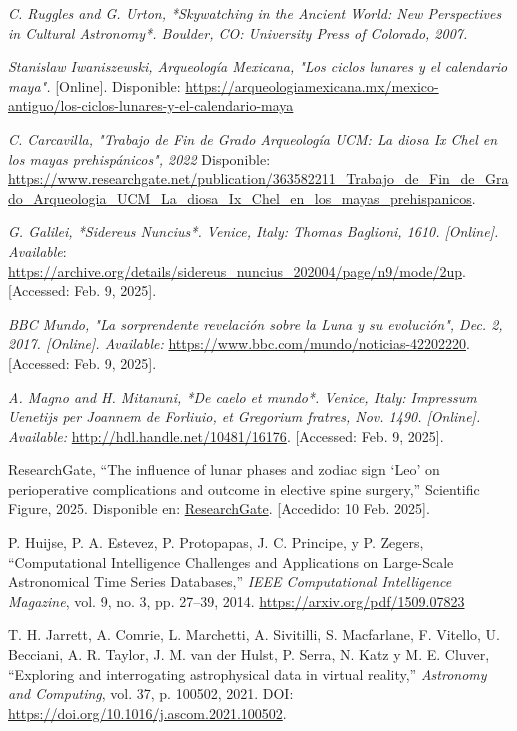\begin{thebibliography}{99}

\textit{C. Ruggles and G. Urton, *Skywatching in the Ancient World: New Perspectives in Cultural Astronomy*. Boulder, CO: University Press of Colorado, 2007.}

 \textit{Stanislaw Iwaniszewski, Arqueología Mexicana, "Los ciclos lunares y el calendario maya".}  [Online]. Disponible: \url{https://arqueologiamexicana.mx/mexico-antiguo/los-ciclos-lunares-y-el-calendario-maya}

 \textit{C. Carcavilla, "Trabajo de Fin de Grado Arqueología UCM: La diosa Ix Chel en los mayas prehispánicos", 2022} Disponible: \url{https://www.researchgate.net/publication/363582211_Trabajo_de_Fin_de_Grado_Arqueologia_UCM_La_diosa_Ix_Chel_en_los_mayas_prehispanicos}.

 \textit{G. Galilei, *Sidereus Nuncius*. Venice, Italy: Thomas Baglioni, 1610. [Online]. Available}: \url{https://archive.org/details/sidereus_nuncius_202004/page/n9/mode/2up}. [Accessed: Feb. 9, 2025].

 \textit{BBC Mundo, "La sorprendente revelación sobre la Luna y su evolución", Dec. 2, 2017. [Online]. Available:} \url{https://www.bbc.com/mundo/noticias-42202220}. [Accessed: Feb. 9, 2025].

 \textit{A. Magno and H. Mitanuni, *De caelo et mundo*. Venice, Italy: Impressum Uenetijs per Joannem de Forliuio, et Gregorium fratres, Nov. 1490. [Online]. Available:} \url{http://hdl.handle.net/10481/16176}. [Accessed: Feb. 9, 2025].

 ResearchGate, 
``The influence of lunar phases and zodiac sign ‘Leo’ on perioperative complications and outcome in elective spine surgery,'' 
Scientific Figure, 2025. Disponible en: \href{https://www.researchgate.net/figure/Woodcut-from-1492-illustrating-the-lunar-phases-from-the-chapter-Liber-de-coelo-et_fig1_301581818}{ResearchGate}. [Accedido: 10 Feb. 2025].


 P. Huijse, P. A. Estevez, P. Protopapas, J. C. Principe, y P. Zegers, 
``Computational Intelligence Challenges and Applications on Large-Scale Astronomical Time Series Databases,'' 
\textit{IEEE Computational Intelligence Magazine}, vol. 9, no. 3, pp. 27–39, 2014. \url{https://arxiv.org/pdf/1509.07823}

 T. H. Jarrett, A. Comrie, L. Marchetti, A. Sivitilli, S. Macfarlane, F. Vitello, U. Becciani, A. R. Taylor, J. M. van der Hulst, P. Serra, N. Katz y M. E. Cluver, 
``Exploring and interrogating astrophysical data in virtual reality,'' 
\textit{Astronomy and Computing}, vol. 37, p. 100502, 2021. 
DOI: \url{https://doi.org/10.1016/j.ascom.2021.100502}.


\end{thebibliography}
